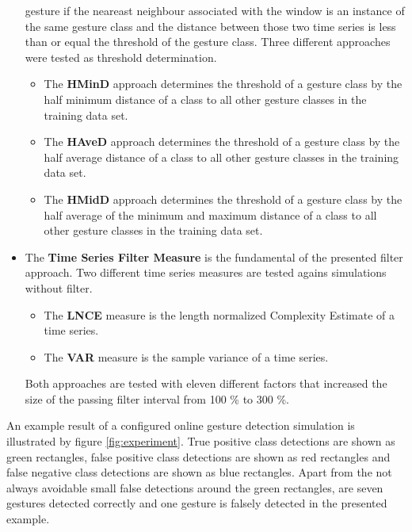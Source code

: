\begin{itemize}
        gesture if the neareast neighbour associated with the window is an instance of the same gesture class and the
        distance between those two time series is less than or equal the threshold of the gesture class. Three different
        approaches were tested as threshold determination.
        \begin{itemize}
            \item The \textbf{HMinD} approach determines the threshold of a gesture class by the half minimum distance
                of a class to all other gesture classes in the training data set.
            \item The \textbf{HAveD} approach determines the threshold of a gesture class by the half average distance
                of a class to all other gesture classes in the training data set.
            \item The \textbf{HMidD} approach determines the threshold of a gesture class by the half average of the
                minimum and maximum distance of a class to all other gesture classes in the training data set.
        \end{itemize}
    \item The \textbf{Time Series Filter Measure} is the fundamental of the presented filter approach. Two different
        time series measures are tested agains simulations without filter.
        \begin{itemize}
            \item The \textbf{LNCE} measure is the length normalized Complexity Estimate of a time series.
            \item The \textbf{VAR} measure is the sample variance of a time series.
        \end{itemize}
        Both approaches are tested with eleven different factors that increased the size of the passing filter interval
        from 100 \% to 300 \%.
\end{itemize}

An example result of a configured online gesture detection simulation is illustrated by figure \ref{fig:experiment}.
True positive class detections are shown as green rectangles, false positive class detections are shown as red
rectangles and false negative class detections are shown as blue rectangles. Apart from the not always avoidable small
false detections around the green rectangles, are seven gestures detected correctly and one gesture is falsely detected
in the presented example.

